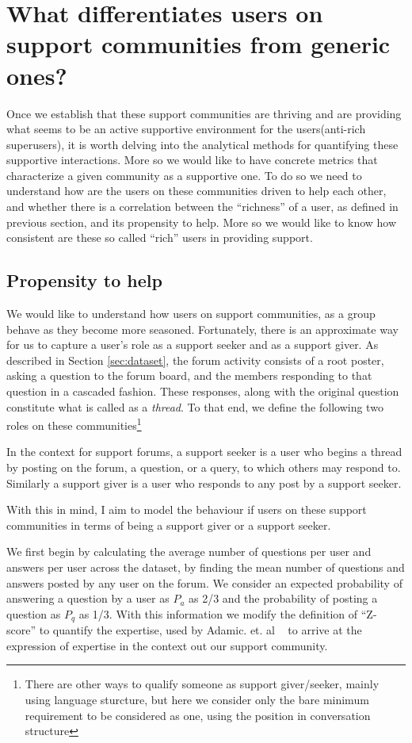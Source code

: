 \section{What differentiates \textbf{users} on support communities from generic ones?}
\label{sec:support}
Once we establish that these support communities are thriving and are providing what seems to be an active supportive environment for the users(anti-rich superusers), it is worth delving into the analytical methods for quantifying these supportive interactions. More so we would like to have concrete metrics that characterize a given community as a supportive one. To do so we need to understand how are the users on these communities driven to help each other, and whether there is a correlation between the ``richness'' of a user, as defined in previous section, and its propensity to help. More so we would like to know how consistent are these so called ``rich'' users in providing support. 

\subsection{Propensity to help} 
We would like to understand how users on support communities, as a group behave as they become more seasoned. Fortunately, there is an approximate way for us to capture a user's role as a support seeker and as a support giver. As described in Section \ref{sec:dataset}, the forum activity consists of a root poster, asking a question to the forum board, and the members responding to that question in a cascaded fashion. These responses, along with the original question constitute what is called as a \textsl{thread}.
To that end, we define the following two roles on these communities\footnote{There are other ways to qualify someone as support giver/seeker, mainly using language sturcture, but here we consider only the bare minimum requirement to be considered as one, using the position in conversation structure}

In the context for support forums, a support seeker is a user who begins a thread by posting on the forum, a question, or a query, to which others may respond to. Similarly a support giver is a user who responds to any post by a support seeker.

With this in mind, I aim to model the behaviour if users on these support communities in terms of being a support giver or a support seeker.

We first begin by calculating the average number of questions per user and answers per user across the dataset, by finding the mean number of questions and answers posted by any user on the forum. 
We consider an expected probability of answering a question by a user as $P_a$ as 2/3 and the probability of posting a question as $P_q$ as 1/3. 
With this information we modify the definition of ``Z-score'' to quantify the expertise, used by Adamic. et. al ~\cite{zhang2007expertise} to arrive at the expression of expertise in the context out our support community. 

